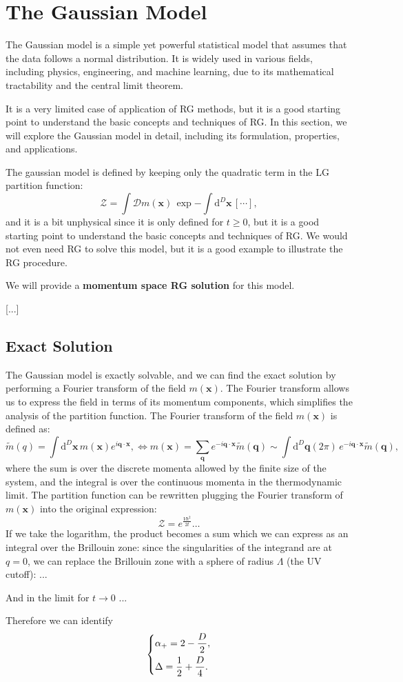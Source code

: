
\section{The Gaussian Model}

The Gaussian model is a simple yet powerful statistical model that assumes that the data follows a normal distribution. It is widely used in various fields, including physics, engineering, and machine learning, due to its mathematical tractability and the central limit theorem.

It is a very limited case of application of RG methods, but it is a good starting point to understand the basic concepts and techniques of RG. In this section, we will explore the Gaussian model in detail, including its formulation, properties, and applications.

The gaussian model is defined by keeping only the quadratic term in the LG partition function:
\[
    \mathcal{Z} = \int \mathcal{D}m(\mathbf{x}) \, \exp {-\int \mathrm{d}^D \mathbf{x} \, \left[ \cdots \right]},
\]
and it is a bit unphysical since it is only defined for \(t \geq 0\), but it is a good starting point to understand the basic concepts and techniques of RG. We would not even need RG to solve this model, but it is a good example to illustrate the RG procedure.

We will provide a \textbf{momentum space RG solution} for this model.

    [...]

\subsection{Exact Solution}

The Gaussian model is exactly solvable, and we can find the exact solution by performing a Fourier transform of the field \(m(\mathbf{x})\). The Fourier transform allows us to express the field in terms of its momentum components, which simplifies the analysis of the partition function. The Fourier transform of the field \(m(\mathbf{x})\) is defined as:
\[
    \tilde{m}(q) = \int \mathrm{d}^D \mathbf{x} \, m(\mathbf{x}) e^{i \mathbf{q} \cdot \mathbf{x}}, \iff m(\mathbf{x}) = \sum_{\mathbf{q}} e^{-i \mathbf{q} \cdot \mathbf{x}} \tilde{m}(\mathbf{q}) \sim \int {\mathrm{d}^D \mathbf{q}}{(2\pi)} \, e^{-i \mathbf{q} \cdot \mathbf{x}} \tilde{m}(\mathbf{q}),
\]
where the sum is over the discrete momenta allowed by the finite size of the system, and the integral is over the continuous momenta in the thermodynamic limit. The partition function can be rewritten plugging the Fourier transform of \(m(\mathbf{x})\) into the original expression:
\[
    \mathcal{Z} = e^{\frac{V\hbar^2}{2t}}\dots
\]
If we take the logarithm, the product becomes a sum which we can express as an integral over the Brillouin zone: since the singularities of the integrand are at \(q=0\), we can replace the Brillouin zone with a sphere of radius \(\Lambda\) (the UV cutoff): ...

And in the limit for \(t \to 0\) ...

Therefore we can identify
\[
    \begin{dcases}
        \alpha_+ = 2 - \frac{D}{2}, \\
        \Delta = \frac{1}{2} + \frac{D}{4}.
    \end{dcases}
\]